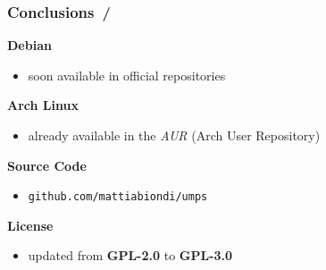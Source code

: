 \documentclass{beamer}
\begin{document}
\begin{frame}
	\frametitle{Conclusions \hspace{0pt plus 1 filll} \insertframenumber\,/\,\inserttotalframenumber}
	\begin{center}
		\begin{block}{\textbf{{\small Debian}}}
			\begin{footnotesize}
				\begin{itemize}
					\item soon available in official repositories
				\end{itemize}
			\end{footnotesize}
		\end{block}
		\begin{block}{\textbf{{\small Arch Linux}}}
			\begin{footnotesize}
				\begin{itemize}
					\item already available in the \textit{AUR} (Arch User Repository)
				\end{itemize}
			\end{footnotesize}
		\end{block}
		\begin{minipage}{0.6\textwidth}
			\begin{block}{\textbf{{\small Source Code}}}
				\begin{footnotesize}
					\begin{itemize}
						\item \texttt{github.com/mattiabiondi/umps}
					\end{itemize}
				\end{footnotesize}
			\end{block}
			\begin{block}{\textbf{{\small License}}}
				\begin{footnotesize}
					\begin{itemize}
						\item updated from \textbf{GPL-2.0} to \textbf{GPL-3.0}
					\end{itemize}
				\end{footnotesize}
			\end{block}

\end{minipage}
\end{center}
\end{frame}
\end{document}
